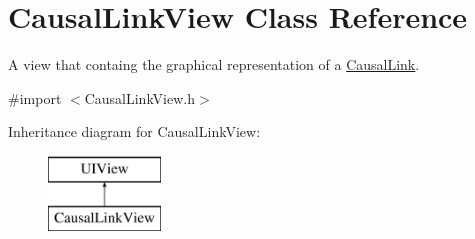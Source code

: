 \hypertarget{interface_causal_link_view}{\section{Causal\-Link\-View Class Reference}
\label{interface_causal_link_view}
}


A view that containg the graphical representation of a \hyperlink{interface_causal_link}{Causal\-Link}.  




{\ttfamily \#import $<$Causal\-Link\-View.\-h$>$}

Inheritance diagram for Causal\-Link\-View\-:\begin{figure}[H]
\begin{center}
\leavevmode
\includegraphics[height=2.000000cm]{interface_causal_link_view}
\end{center}
\end{figure}
